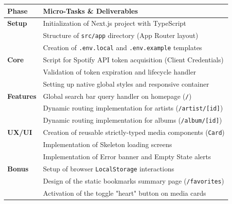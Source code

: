 \documentclass{article}
\begin{document}
\begin{table}[h!]
    \centering
    \begin{tabular}{|l|l|}
        \hline
        \textbf{Phase} & \textbf{Micro-Tasks \& Deliverables} \\
        \hline
        \textbf{Setup} & Initialization of Next.js project with TypeScript \\
                       & Structure of \texttt{src/app} directory (App Router layout) \\
                       & Creation of \texttt{.env.local} and \texttt{.env.example} templates \\
        \hline
        \textbf{Core} & Script for Spotify API token acquisition (Client Credentials) \\
                      & Validation of token expiration and lifecycle handler \\
                      & Setting up native global styles and responsive container \\
        \hline
        \textbf{Features} & Global search bar query handler on homepage (\texttt{/}) \\
                          & Dynamic routing implementation for artists (\texttt{/artist/[id]}) \\
                          & Dynamic routing implementation for albums (\texttt{/album/[id]}) \\
        \hline
        \textbf{UX/UI} & Creation of reusable strictly-typed media components (\texttt{Card}) \\
                       & Implementation of Skeleton loading screens \\
                       & Implementation of Error banner and Empty State alerts \\
        \hline
        \textbf{Bonus} & Setup of browser \texttt{LocalStorage} interactions \\
                       & Design of the static bookmarks summary page (\texttt{/favorites}) \\
                       & Activation of the toggle "heart" button on media cards \\
        \hline
    \end{tabular}
\end{table}\
\end{document}
